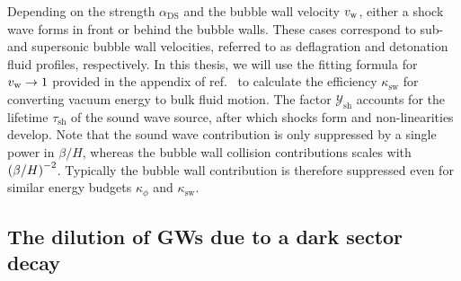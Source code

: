 Depending on the strength $\alpha_\text{DS}$ and the bubble wall velocity $v_\mathrm{w}$, either a shock wave forms in front or behind the bubble walls. These cases correspond to sub- and supersonic bubble wall velocities, referred to as deflagration and detonation fluid profiles, respectively. In this thesis,  we will use the fitting formula for $v_\mathrm{w} \rightarrow 1$ provided in the appendix of ref.~\cite{Espinosa:2010hh} to calculate the efficiency $\kappa_\text{sw}$ for converting vacuum energy to bulk fluid motion. The factor $\mathcal{Y}_\text{sh}$ accounts for the lifetime $\tau_\text{sh}$ of the sound wave source, after which shocks form and non-linearities develop. Note that the sound wave contribution is only suppressed by a single power in $\beta/H$, whereas the bubble wall collision contributions scales with $\left( \beta/H \right)^{-2}$. Typically the bubble wall contribution is therefore suppressed even for similar energy budgets $\kappa_\phi$ and $\kappa_\text{sw}$. 


\subsection{The dilution of GWs due to a dark sector decay} \label{sec:DSdecaydilution}

